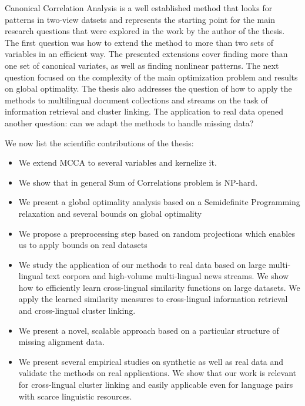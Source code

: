 Canonical Correlation Analysis is a well established method that looks for patterns in two-view datsets and represents
the starting point for the main research questions that were explored in the work by the author of the thesis. The
first question was how to extend the method to more than two sets of variables in an efficient way. The presented extensions
cover finding more than one set of canonical variates, as well as finding nonlinear patterns. The
next question focused on the complexity of the main optimization problem and results on global optimality.
The thesis also addresses the question of how to apply the methods to multilingual document collections and streams
on the task of information retrieval and cluster linking. The application to real data opened another question: can
we adapt the methods to handle missing data?

We now list the scientific contributions of the thesis:
\begin{itemize}
\item We extend MCCA to several variables and kernelize it.
\item We show that in general Sum of Correlations problem is NP-hard.
\item We present a global optimality analysis based on a Semidefinite Programming relaxation and several bounds on global optimality
\item We propose a preprocessing step based on random projections which enables us to apply bounds on real datasets
\item We study the application of our methods to real data based on large multi-lingual text corpora and high-volume multi-lingual news streams. We show how to efficiently learn cross-lingual similarity functions on large datasets. We apply the learned similarity measures to cross-lingual information retrieval and
    cross-lingual cluster linking.
\item We present a novel, scalable approach based on a particular structure of missing alignment data.
\item We present several empirical studies on synthetic as well as real data and validate the methods on real applications. We show that our work is relevant for cross-lingual cluster linking and easily applicable even for language pairs with scarce linguistic resources.
\end{itemize}

